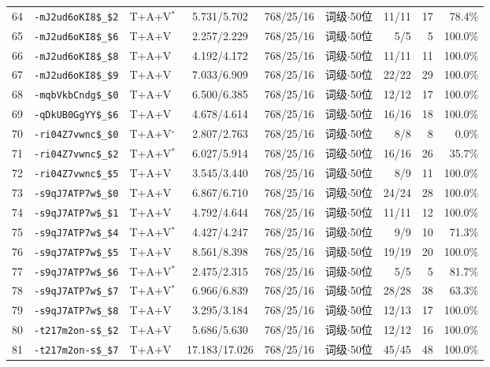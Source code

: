 \begin{longtable}{rllcccrrr}
64 & \texttt{-mJ2ud6oKI8\$\_\$2} & T+A+V$^{*}$ & 5.731/5.702 & 768/25/16 & 词级$\cdot$50位 & 11/11 & 17 & 78.4\% \\
65 & \texttt{-mJ2ud6oKI8\$\_\$6} & T+A+V & 2.257/2.229 & 768/25/16 & 词级$\cdot$50位 & 5/5 & 5 & 100.0\% \\
66 & \texttt{-mJ2ud6oKI8\$\_\$8} & T+A+V & 4.192/4.172 & 768/25/16 & 词级$\cdot$50位 & 11/11 & 11 & 100.0\% \\
67 & \texttt{-mJ2ud6oKI8\$\_\$9} & T+A+V & 7.033/6.909 & 768/25/16 & 词级$\cdot$50位 & 22/22 & 29 & 100.0\% \\
68 & \texttt{-mqbVkbCndg\$\_\$0} & T+A+V & 6.500/6.385 & 768/25/16 & 词级$\cdot$50位 & 12/12 & 17 & 100.0\% \\
69 & \texttt{-qDkUB0GgYY\$\_\$6} & T+A+V & 4.678/4.614 & 768/25/16 & 词级$\cdot$50位 & 16/16 & 18 & 100.0\% \\
70 & \texttt{-ri04Z7vwnc\$\_\$0} & T+A+V$^{\circ}$ & 2.807/2.763 & 768/25/16 & 词级$\cdot$50位 & 8/8 & 8 & 0.0\% \\
71 & \texttt{-ri04Z7vwnc\$\_\$2} & T+A+V$^{*}$ & 6.027/5.914 & 768/25/16 & 词级$\cdot$50位 & 16/16 & 26 & 35.7\% \\
72 & \texttt{-ri04Z7vwnc\$\_\$5} & T+A+V & 3.545/3.440 & 768/25/16 & 词级$\cdot$50位 & 8/9 & 11 & 100.0\% \\
73 & \texttt{-s9qJ7ATP7w\$\_\$0} & T+A+V & 6.867/6.710 & 768/25/16 & 词级$\cdot$50位 & 24/24 & 28 & 100.0\% \\
74 & \texttt{-s9qJ7ATP7w\$\_\$1} & T+A+V & 4.792/4.644 & 768/25/16 & 词级$\cdot$50位 & 11/11 & 12 & 100.0\% \\
75 & \texttt{-s9qJ7ATP7w\$\_\$4} & T+A+V$^{*}$ & 4.427/4.247 & 768/25/16 & 词级$\cdot$50位 & 9/9 & 10 & 71.3\% \\
76 & \texttt{-s9qJ7ATP7w\$\_\$5} & T+A+V & 8.561/8.398 & 768/25/16 & 词级$\cdot$50位 & 19/19 & 20 & 100.0\% \\
77 & \texttt{-s9qJ7ATP7w\$\_\$6} & T+A+V$^{*}$ & 2.475/2.315 & 768/25/16 & 词级$\cdot$50位 & 5/5 & 5 & 81.7\% \\
78 & \texttt{-s9qJ7ATP7w\$\_\$7} & T+A+V$^{*}$ & 6.966/6.839 & 768/25/16 & 词级$\cdot$50位 & 28/28 & 38 & 63.3\% \\
79 & \texttt{-s9qJ7ATP7w\$\_\$8} & T+A+V & 3.295/3.184 & 768/25/16 & 词级$\cdot$50位 & 12/13 & 17 & 100.0\% \\
80 & \texttt{-t217m2on-s\$\_\$2} & T+A+V & 5.686/5.630 & 768/25/16 & 词级$\cdot$50位 & 12/12 & 16 & 100.0\% \\
81 & \texttt{-t217m2on-s\$\_\$7} & T+A+V & 17.183/17.026 & 768/25/16 & 词级$\cdot$50位 & 45/45 & 48 & 100.0\% \\

\end{longtable}
